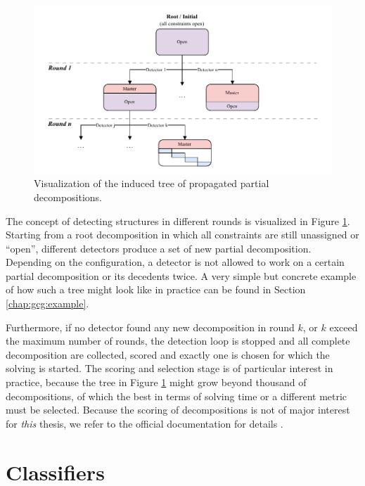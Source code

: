 		\begin{figure}[ht!]
			\centering
			\includegraphics{Bilder/DrawIO/partialdec_tree_pdf}
			\caption{Visualization of the induced tree of propagated partial decompositions.}
			\label{fig:gcg:partialdettree}
		\end{figure}
		
		The concept of detecting structures in different rounds is visualized in Figure \ref{fig:gcg:partialdettree}.
		Starting from a root decomposition in which all constraints are still unassigned or \enquote{open}, different detectors produce a set of new partial decomposition.
		Depending on the configuration, a detector is not allowed to work on a certain partial decomposition or its decedents twice.
		A very simple but concrete example of how such a tree might look like in practice can be found in Section \ref{chap:gcg:example}.
		
		Furthermore, if no detector found any new decomposition in round $k$, or $k$ exceed the maximum number of rounds, the detection loop is stopped and all complete decomposition are collected, scored and exactly one is chosen for which the solving is started. 
		The scoring and selection stage is of particular interest in practice, because the tree in Figure \ref{fig:gcg:partialdettree} might grow beyond thousand of decompositions, of which the best in terms of solving time or a different metric must be selected.
		Because the scoring of decompositions is not of major interest for \textit{this} thesis, we refer to the official documentation for details \cite{GCG}.
	
	\clearpage
	
	\section{Classifiers}
	\label{chap:gcg:classifiers}

